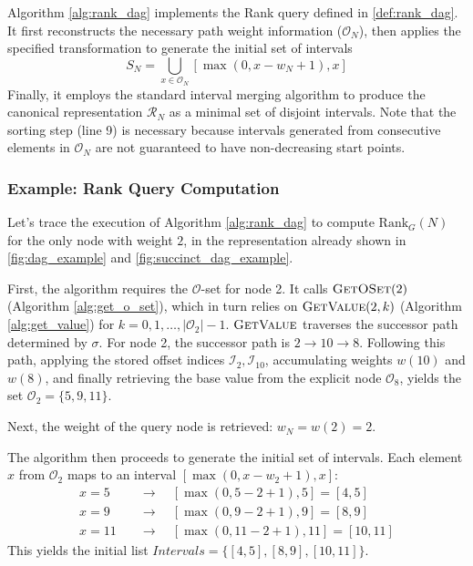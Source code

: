 Algorithm \ref{alg:rank_dag} implements the Rank query defined in \ref{def:rank_dag}. It first reconstructs the necessary path weight information ($\mathcal{O}_N$), then applies the specified transformation to generate the initial set of intervals
\[S_N = \bigcup_{x \in \mathcal{O}_N} [ \max(0, x - w_N + 1), x ]\]
Finally, it employs the standard interval merging algorithm to produce the canonical representation $\mathcal{R}_N$ as a minimal set of disjoint intervals. Note that the sorting step (line 9) is necessary because intervals generated from consecutive elements in $\mathcal{O}_N$ are not guaranteed to have non-decreasing start points.

\subsubsection*{Example: Rank Query Computation \label{subsubsec:rank_query_example_node2}}

Let's trace the execution of Algorithm \ref{alg:rank_dag} to compute $\mathrm{Rank}_G(N)$ for the only node with weight $2$, in the representation already shown in \autoref{fig:dag_example} and \autoref{fig:succinct_dag_example}.

First, the algorithm requires the $\mathcal{O}$-set for node 2. It calls $\textsc{GetOSet}(2)$ (Algorithm \ref{alg:get_o_set}), which in turn relies on $\textsc{GetValue}(2, k)$ (Algorithm \ref{alg:get_value}) for $k=0, 1, \dots, |\mathcal{O}_2|-1$. $\textsc{GetValue}$ traverses the successor path determined by $\sigma$. For node 2, the successor path is $2 \to 10 \to 8$. Following this path, applying the stored offset indices $\mathcal{I}_2, \mathcal{I}_{10}$, accumulating weights $w(10)$ and $w(8)$, and finally retrieving the base value from the explicit node $\mathcal{O}_8$, yields the set $\mathcal{O}_2 = \{5, 9, 11\}$.

Next, the weight of the query node is retrieved: $w_N = w(2) = 2$.

The algorithm then proceeds to generate the initial set of intervals. Each element $x$ from $\mathcal{O}_2$ maps to an interval $[\max(0, x - w_2 + 1), x]$:
\begin{align*}
    x=5 \quad  & \longrightarrow \quad [\max(0, 5 - 2 + 1), 5] = [4, 5]     \\
    x=9 \quad  & \longrightarrow \quad [\max(0, 9 - 2 + 1), 9] = [8, 9]     \\
    x=11 \quad & \longrightarrow \quad [\max(0, 11 - 2 + 1), 11] = [10, 11]
\end{align*}
This yields the initial list $Intervals = \{ [4, 5], [8, 9], [10, 11] \}$.

